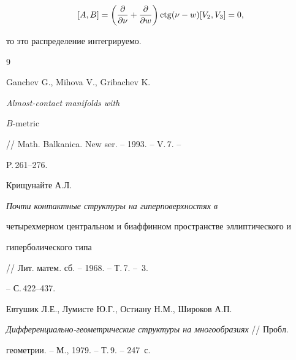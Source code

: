 $$ 


[A,B]=\bigg(\frac{\partial}{\partial \nu}+ 


\frac{\partial}{\partial w}\bigg)\cotg(\nu-w) 


[V_2,V_3]=0,


$$ 


то это распределение интегрируемо. 


 


 


\begin{thebibliography}{9} 


 




Ganchev G., Mihova V., Gribachev K. {\em Almost-contact manifolds with 


$B$-metric} // Math. Balkanica. New ser. -- 1993. -- V.\,7. -- 


P.\,261--276. 




Крищунайте А.Л. {\em Почти контактные структуры на гиперповерхностях в 


четырехмерном центральном и биаффинном пространстве эллиптического и 


гиперболического типа} // Лит. матем. сб. -- 1968. -- Т.\,7. -- \No\,3. 


-- С.\,422--437. 


 










 




Евтушик Л.Е., Лумисте Ю.Г., Остиану Н.М., Широков А.П.


{\em Дифференциально-геометрические структуры на многообразиях} // Пробл.


геометрии. -- М., 1979. -- Т.\,9. -- 247~с.





 


\end{thebibliography} 


 


\vskip 2cm 


 






 


\label{end} 


 


